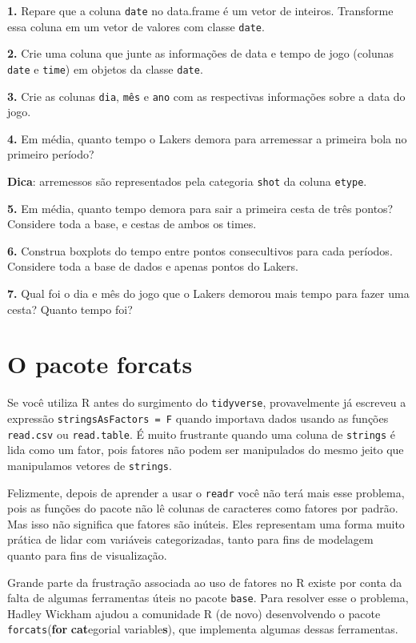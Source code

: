 \documentclass[
]{book}
\begin{document}
\textbf{1.} Repare que a coluna \texttt{date} no data.frame é um vetor de inteiros. Transforme essa coluna em um vetor de valores com classe \texttt{date}.

\textbf{2.} Crie uma coluna que junte as informações de data e tempo de jogo (colunas \texttt{date} e \texttt{time}) em objetos da classe \texttt{date}.

\textbf{3.} Crie as colunas \texttt{dia}, \texttt{mês} e \texttt{ano} com as respectivas informações sobre a data do jogo.

\textbf{4.} Em média, quanto tempo o Lakers demora para arremessar a primeira bola no primeiro período?

\textbf{Dica}: arremessos são representados pela categoria \texttt{shot} da coluna \texttt{etype}.

\textbf{5.} Em média, quanto tempo demora para sair a primeira cesta de três pontos? Considere toda a base, e cestas de ambos os times.

\textbf{6.} Construa boxplots do tempo entre pontos consecultivos para cada períodos. Considere toda a base de dados e apenas pontos do Lakers.

\textbf{7.} Qual foi o dia e mês do jogo que o Lakers demorou mais tempo para fazer uma cesta? Quanto tempo foi?

\hypertarget{forcats}{%
\section{O pacote forcats}\label{forcats}}

Se você utiliza R antes do surgimento do \texttt{tidyverse}, provavelmente já escreveu a expressão \texttt{stringsAsFactors\ =\ F} quando importava dados usando as funções \texttt{read.csv} ou \texttt{read.table}. É muito frustrante quando uma coluna de \texttt{strings} é lida como um fator, pois fatores não podem ser manipulados do mesmo jeito que manipulamos vetores de \texttt{strings}.

Felizmente, depois de aprender a usar o \texttt{readr} você não terá mais esse problema, pois as funções do pacote não lê colunas de caracteres como fatores por padrão. Mas isso não significa que fatores são inúteis. Eles representam uma forma muito prática de lidar com variáveis categorizadas, tanto para fins de modelagem quanto para fins de visualização.

Grande parte da frustração associada ao uso de fatores no R existe por conta da falta de algumas ferramentas úteis no pacote \texttt{base}. Para resolver esse o problema, Hadley Wickham ajudou a comunidade R (de novo) desenvolvendo o pacote \texttt{forcats}(\textbf{for} \textbf{cat}egorial variable\textbf{s}), que implementa algumas dessas ferramentas.
\end{document}
